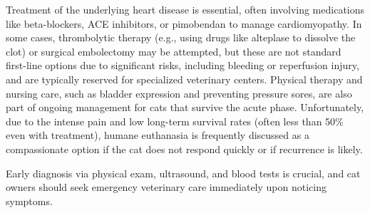 \documentclass[]{article}
\begin{document}
Treatment of the underlying heart disease is essential, often involving medications like beta-blockers, ACE inhibitors, or pimobendan to manage cardiomyopathy. In some cases, thrombolytic therapy (e.g., using drugs like alteplase to dissolve the clot) or surgical embolectomy may be attempted, but these are not standard first-line options due to significant risks, including bleeding or reperfusion injury, and are typically reserved for specialized veterinary centers. Physical therapy and nursing care, such as bladder expression and preventing pressure sores, are also part of ongoing management for cats that survive the acute phase. Unfortunately, due to the intense pain and low long-term survival rates (often less than 50\% even with treatment), humane euthanasia is frequently discussed as a compassionate option if the cat does not respond quickly or if recurrence is likely. 

Early diagnosis via physical exam, ultrasound, and blood tests is crucial, and cat owners should seek emergency veterinary care immediately upon noticing symptoms.
\end{document}

